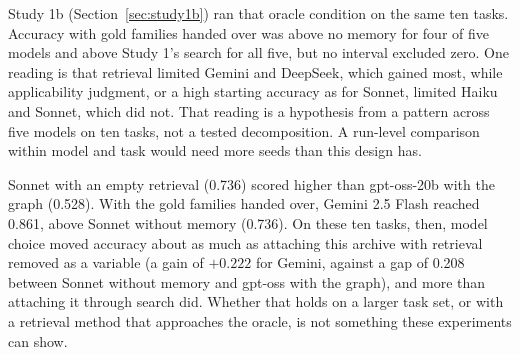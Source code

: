Study 1b (Section~\ref{sec:study1b}) ran that oracle condition on the same ten tasks. Accuracy with gold families handed over was above no memory for four of five models and above Study 1's search for all five, but no interval excluded zero. One reading is that retrieval limited Gemini and DeepSeek, which gained most, while applicability judgment, or a high starting accuracy as for Sonnet, limited Haiku and Sonnet, which did not. That reading is a hypothesis from a pattern across five models on ten tasks, not a tested decomposition. A run-level comparison within model and task would need more seeds than this design has.

Sonnet with an empty retrieval (0.736) scored higher than gpt-oss-20b with the graph (0.528). With the gold families handed over, Gemini 2.5 Flash reached 0.861, above Sonnet without memory (0.736). On these ten tasks, then, model choice moved accuracy about as much as attaching this archive with retrieval removed as a variable (a gain of $+0.222$ for Gemini, against a gap of 0.208 between Sonnet without memory and gpt-oss with the graph), and more than attaching it through search did. Whether that holds on a larger task set, or with a retrieval method that approaches the oracle, is not something these experiments can show.

